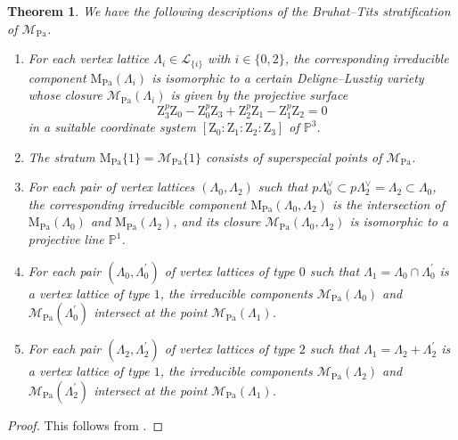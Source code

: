 \documentclass[10pt]{amsart}
\numberwithin{equation}{section}
\newtheorem{theorem}[equation]{Theorem}
\theoremstyle{definition}
\def\Pa{\mathrm{Pa}}
\def\calL{\mathcal{L}}
\def\calM{\mathcal{M}}
\def\PP{\mathbb{P}}
\def\rmM{\mathrm{M}}
\def\rmZ{\mathrm{Z}}
\begin{document}
\begin{theorem}\label{RZ-description}
We have the following descriptions of the Bruhat--Tits stratification of $\calM_{\Pa}$.
\begin{enumerate}
\item For each vertex lattice $\Lambda_{i}\in \calL_{\{i\}}$ with $i\in\{0,2\}$, the corresponding irreducible component $\rmM_{\Pa}(\Lambda_{i})$ is isomorphic to a certain Deligne--Lusztig variety  whose closure $\calM_{\Pa}(\Lambda_{i})$ is given by the projective surface  
\begin{equation*}
\rmZ_{3}^{p}\rmZ_{0}-\rmZ^{p}_{0}\rmZ_{3}+\rmZ^{p}_{2}\rmZ_{1}-\rmZ^{p}_{1}\rmZ_{2}=0
\end{equation*}
in a suitable coordinate system $[\rmZ_{0}: \rmZ_{1}:  \rmZ_{2}: \rmZ_{3}]$ of $\PP^{3}$. 

\item The stratum $\rmM_{\Pa}\{1\}=\calM_{\Pa}\{1\}$ consists of superspecial points of $\calM_{\Pa}$.

\item For each pair of vertex lattices $(\Lambda_{0}, \Lambda_{2})$ such that
$p\Lambda^{\vee}_{0}\subset p\Lambda^{\vee}_{2}=\Lambda_{2}\subset \Lambda_{0}$, the corresponding irreducible component $\rmM_{\Pa}(\Lambda_{0}, \Lambda_{2})$ is the intersection of $\rmM_{\Pa}(\Lambda_{0})$ and $\rmM_{\Pa}(\Lambda_{2})$, and its closure $\calM_{\Pa}(\Lambda_{0}, \Lambda_{2})$ is isomorphic to a projective line $\PP^{1}$.

\item For each pair $(\Lambda_{0}, \Lambda^{\prime}_{0})$ of vertex lattices of type $0$ such that $\Lambda_{1}=\Lambda_{0}\cap\Lambda^{\prime}_{0}$ is a vertex lattice of type $1$, the irreducible components $\calM_{\Pa}(\Lambda_{0})$ and $\calM_{\Pa}(\Lambda^{\prime}_{0})$ intersect at the point $\calM_{\Pa}(\Lambda_{1})$. 

\item For each pair $(\Lambda_{2}, \Lambda^{\prime}_{2})$ of vertex lattices of type $2$ such that $\Lambda_{1}=\Lambda_{2}+\Lambda^{\prime}_{2}$ is a vertex lattice of type $1$, the irreducible components $\calM_{\Pa}(\Lambda_{2})$ and $\calM_{\Pa}(\Lambda^{\prime}_{2})$ intersect at the point $\calM_{\Pa}(\Lambda_{1})$.
\end{enumerate}
\end{theorem}
\begin{proof}
This follows from  \cite[Theorem 5.1]{Wanga}.
\end{proof}
\end{document}
